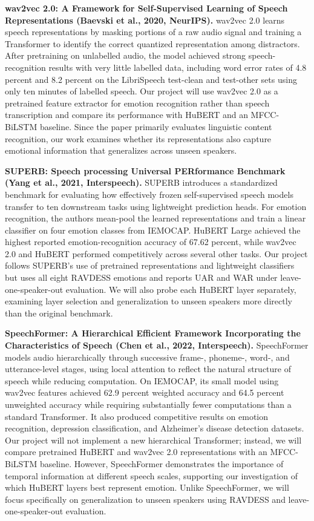\documentclass[11pt, letterpaper]{article}
\begin{document}
\textbf{wav2vec 2.0: A Framework for Self-Supervised Learning of Speech Representations (Baevski et al., 2020, NeurIPS).} wav2vec 2.0 learns speech representations by masking portions of a raw audio signal and training a Transformer to identify the correct quantized representation among distractors. After pretraining on unlabelled audio, the model achieved strong speech-recognition results with very little labelled data, including word error rates of 4.8 percent and 8.2 percent on the LibriSpeech test-clean and test-other sets using only ten minutes of labelled speech. Our project will use wav2vec 2.0 as a pretrained feature extractor for emotion recognition rather than speech transcription and compare its performance with HuBERT and an MFCC-BiLSTM baseline. Since the paper primarily evaluates linguistic content recognition, our work examines whether its representations also capture emotional information that generalizes across unseen speakers.

\textbf{SUPERB: Speech processing Universal PERformance Benchmark (Yang et al., 2021, Interspeech).} SUPERB introduces a standardized benchmark for evaluating how effectively frozen self-supervised speech models transfer to ten downstream tasks using lightweight prediction heads. For emotion recognition, the authors mean-pool the learned representations and train a linear classifier on four emotion classes from IEMOCAP. HuBERT Large achieved the highest reported emotion-recognition accuracy of 67.62 percent, while wav2vec 2.0 and HuBERT performed competitively across several other tasks. Our project follows SUPERB’s use of pretrained representations and lightweight classifiers but uses all eight RAVDESS emotions and reports UAR and WAR under leave-one-speaker-out evaluation. We will also probe each HuBERT layer separately, examining layer selection and generalization to unseen speakers more directly than the original benchmark.

\textbf{SpeechFormer: A Hierarchical Efficient Framework Incorporating the Characteristics of Speech (Chen et al., 2022, Interspeech).} SpeechFormer models audio hierarchically through successive frame-, phoneme-, word-, and utterance-level stages, using local attention to reflect the natural structure of speech while reducing computation. On IEMOCAP, its small model using wav2vec features achieved 62.9 percent weighted accuracy and 64.5 percent unweighted accuracy while requiring substantially fewer computations than a standard Transformer. It also produced competitive results on emotion recognition, depression classification, and Alzheimer’s disease detection datasets. Our project will not implement a new hierarchical Transformer; instead, we will compare pretrained HuBERT and wav2vec 2.0 representations with an MFCC-BiLSTM baseline. However, SpeechFormer demonstrates the importance of temporal information at different speech scales, supporting our investigation of which HuBERT layers best represent emotion. Unlike SpeechFormer, we will focus specifically on generalization to unseen speakers using RAVDESS and leave-one-speaker-out evaluation.
\end{document}
